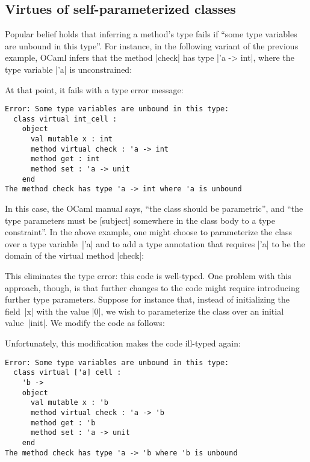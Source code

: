 \documentclass[11pt,a4paper,twoside]{article}
\begin{document}

\subsection{Virtues of self-parameterized classes}
\label{sec:oo:self}

Popular belief holds that inferring a method's type fails if ``some type
variables are unbound in this type''. For instance, in the following variant
of the previous example, OCaml infers that the method \oc|check| has type
\oc|'a -> int|, where the type variable \oc|'a| is unconstrained:
%

At that point, it fails with a type error message:
%
\begin{mdframed}[backgroundcolor=red!10]
\begin{lstlisting}[keywords={}]
Error: Some type variables are unbound in this type:
  class virtual int_cell :
    object
      val mutable x : int
      method virtual check : 'a -> int
      method get : int
      method set : 'a -> unit
    end
The method check has type 'a -> int where 'a is unbound
\end{lstlisting}
\end{mdframed}

In this case, the OCaml manual says, ``the class should be parametric'', and
``the type parameters must be [subject] somewhere in the class body to a type
constraint''. In the above example, one might choose to parameterize the class
over a type variable~\oc|'a| and to add a type annotation that requires
\oc|'a| to be the domain of the virtual method \oc|check|:
%

This eliminates the type error: this code is well-typed. One problem with this
approach, though, is that further changes to the code might require
introducing further type parameters. Suppose for instance that, instead of
initializing the field~\oc|x| with the value \oc|0|, we wish to parameterize
the class over an initial value~\oc|init|. We modify the code as follows:
%

Unfortunately, this modification makes the code ill-typed again:
%
\begin{mdframed}[backgroundcolor=red!10]
\begin{lstlisting}[keywords={}]
Error: Some type variables are unbound in this type:
  class virtual ['a] cell :
    'b ->
    object
      val mutable x : 'b
      method virtual check : 'a -> 'b
      method get : 'b
      method set : 'a -> unit
    end
The method check has type 'a -> 'b where 'b is unbound
\end{lstlisting}
\end{mdframed}
\end{document}
